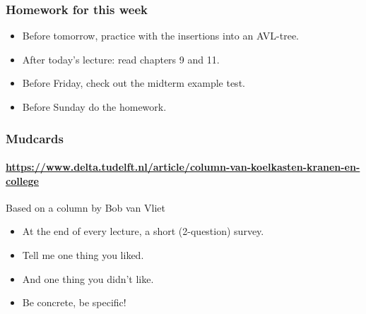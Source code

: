 
\begin{frame}
	\frametitle{Homework for this week}
	\begin{itemize}[<+->]
		\item \alert{Before} tomorrow, practice with the insertions into an AVL-tree.
		\item \alert{After} today's lecture: read chapters 9 and 11.
		\item \alert{Before} Friday, check out the midterm example test.
		\item \alert{Before} Sunday do the homework.
	\end{itemize}
\end{frame}

\begin{frame}
	\frametitle{Mudcards}
	\framesubtitle{\url{https://www.delta.tudelft.nl/article/column-van-koelkasten-kranen-en-college}}

	\begin{block}{Based on a column by Bob van Vliet}
		\begin{itemize}
			\item At the end of every lecture, a short (2-question) survey.
			\item Tell me one thing you liked.
			\item And one thing you didn't like.
			\item Be concrete, be specific!
		\end{itemize}
	\end{block}
\end{frame}

